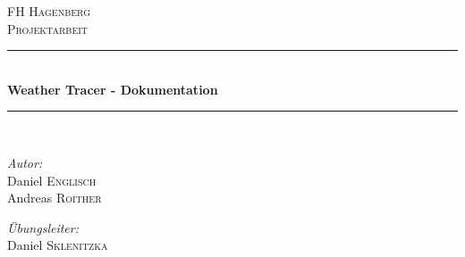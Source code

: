 \documentclass[12pt, letterpaper]{article}
\begin{document}

\begin{titlepage} %
\newcommand{\HRule}{\rule{\linewidth}{0.5mm}} %

\center %
 

\textsc{\LARGE FH Hagenberg}\\[1.5cm] %
\textsc{\Large Projektarbeit}\\[0.5cm] %


\HRule \\[0.4cm]
{ \huge \bfseries Weather Tracer - Dokumentation}\\[0.4cm] %
\HRule \\[1.5cm]
 

\begin{minipage}{0.9\textwidth}
\begin{flushleft} \large
\emph{Autor:}\\
Daniel \textsc{Englisch}\\ %
Andreas \textsc{Roither} %
\end{flushleft}
\end{minipage}

\begin{minipage}{0.9\textwidth}
\begin{flushright} \large
\emph{Übungsleiter:} \\
Daniel \textsc{Sklenitzka} %
\end{flushright}
\end{minipage}\\[2cm]



\end{titlepage}
\end{document}
